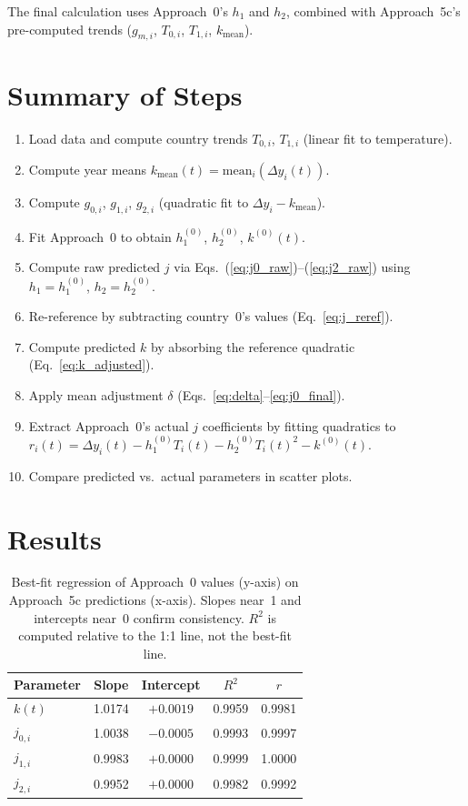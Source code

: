 \documentclass[11pt]{article}
\begin{document}
The final calculation uses Approach~0's $h_1$ and $h_2$, combined with Approach~5c's
pre-computed trends ($g_{m,i}$, $T_{0,i}$, $T_{1,i}$, $k_{\mathrm{mean}}$).

\section{Summary of Steps}

\begin{enumerate}
\item Load data and compute country trends $T_{0,i}$, $T_{1,i}$ (linear fit to temperature).
\item Compute year means $k_{\mathrm{mean}}(t) = \text{mean}_i(\Delta y_i(t))$.
\item Compute $g_{0,i}$, $g_{1,i}$, $g_{2,i}$ (quadratic fit to $\Delta y_i - k_{\mathrm{mean}}$).
\item Fit Approach~0 to obtain $h_1^{(0)}$, $h_2^{(0)}$, $k^{(0)}(t)$.
\item Compute raw predicted $j$ via Eqs.~(\ref{eq:j0_raw})--(\ref{eq:j2_raw})
      using $h_1 = h_1^{(0)}$, $h_2 = h_2^{(0)}$.
\item Re-reference by subtracting country~0's values (Eq.~\ref{eq:j_reref}).
\item Compute predicted $k$ by absorbing the reference quadratic (Eq.~\ref{eq:k_adjusted}).
\item Apply mean adjustment $\delta$ (Eqs.~\ref{eq:delta}--\ref{eq:j0_final}).
\item Extract Approach~0's actual $j$ coefficients by fitting quadratics to
      $r_i(t) = \Delta y_i(t) - h_1^{(0)} T_i(t) - h_2^{(0)} T_i(t)^2 - k^{(0)}(t)$.
\item Compare predicted vs.\ actual parameters in scatter plots.
\end{enumerate}

\section{Results}

\begin{table}[h]
\centering
\begin{tabular}{lcccc}
\toprule
Parameter & Slope & Intercept & $R^2$ & $r$ \\
\midrule
$k(t)$    & 1.0174 & $+0.0019$ & 0.9959 & 0.9981 \\
$j_{0,i}$ & 1.0038 & $-0.0005$ & 0.9993 & 0.9997 \\
$j_{1,i}$ & 0.9983 & $+0.0000$ & 0.9999 & 1.0000 \\
$j_{2,i}$ & 0.9952 & $+0.0000$ & 0.9982 & 0.9992 \\
\bottomrule
\end{tabular}
\caption{Best-fit regression of Approach~0 values (y-axis) on Approach~5c predictions
(x-axis). Slopes near~1 and intercepts near~0 confirm consistency.
$R^2$ is computed relative to the 1:1 line, not the best-fit line.}
\label{tab:results}
\end{table}
\end{document}
